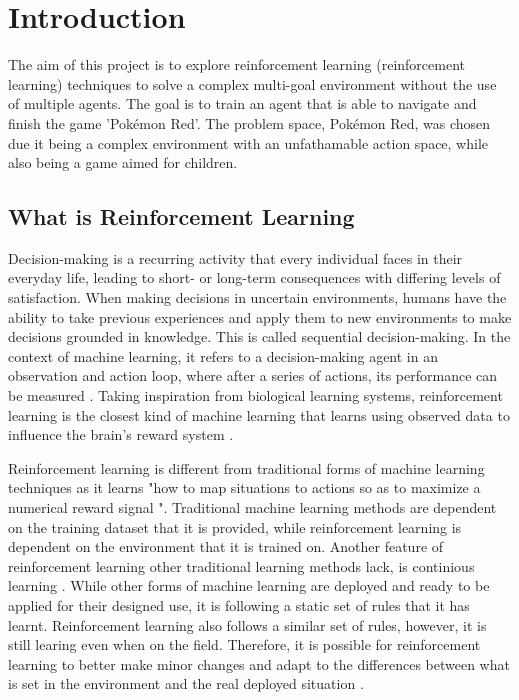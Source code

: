\section{Introduction}

The aim of this project is to explore reinforcement learning (reinforcement learning) techniques to solve a complex multi-goal environment without the use of multiple agents. The goal is to train an agent that is able to navigate and finish the game 'Pokémon Red'. The problem space, Pokémon Red, was chosen due it being a complex environment with an unfathamable action space, while also being a game aimed for children.


\subsection{What is Reinforcement Learning}

Decision-making is a recurring activity that every individual faces in their everyday life, leading to short- or long-term consequences with differing levels of satisfaction. When making decisions in uncertain environments, humans have the ability to take previous experiences and apply them to new environments to make decisions grounded in knowledge. This is called sequential decision-making. In the context of machine learning, it refers to a decision-making agent in an observation and action loop, where after a series of actions, its performance can be measured \cite{francon2020effective}. Taking inspiration from biological learning systems, reinforcement learning is the closest kind of machine learning that learns using observed data to influence the brain's reward system \cite{Sutton1}. 

Reinforcement learning is different from traditional forms of machine learning techniques as it learns "how to map situations to actions so as to maximize a numerical reward signal \cite{Sutton1}". Traditional machine learning methods are dependent on the training dataset that it is provided, while reinforcement learning is dependent on the environment that it is trained on. Another feature of reinforcement learning other traditional learning methods lack, is continious learning \cite{sreenivas2022safe}. While other forms of machine learning are deployed and ready to be applied for their designed use, it is following a static set of rules that it has learnt. Reinforcement learning also follows a similar set of rules, however, it is still learing even when on the field. Therefore, it is possible for reinforcement learning to better make minor changes and adapt to the differences between what is set in the environment and the real deployed situation \cite{sreenivas2022safe}.


